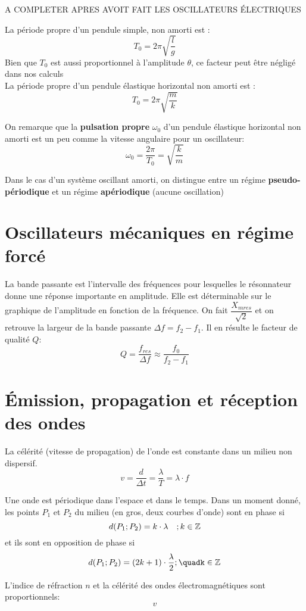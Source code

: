 \begin{Definition}
A COMPLETER APRES AVOIT FAIT LES OSCILLATEURS ÉLECTRIQUES

La période propre d'un pendule simple, non amorti est : 
$$T_{0}=2\pi\sqrt{\dfrac{l}{g}}$$
Bien que $T_{0}$ est aussi proportionnel à l'amplitude $\theta$, ce facteur peut être négligé dans nos calculs\\

La période propre d'un pendule élastique horizontal non amorti est :
$$T_{0}=2\pi\sqrt{\dfrac{m}{k}}$$

On remarque que la \textbf{pulsation propre} $\omega_{0}$ d'un pendule élastique horizontal non amorti est un peu comme la vitesse angulaire pour un oscillateur:
$$\omega_{0}=\dfrac{2\pi}{T_{0}}=\sqrt{\dfrac{k}{m}}$$

Dans le cas d'un système oscillant amorti, on distingue entre un régime \textbf{pseudo-périodique} et un régime \textbf{apériodique} (aucune oscillation)

\end{Definition}



\section{Oscillateurs mécaniques en régime forcé}

\begin{Definition}

La bande passante est l'intervalle des fréquences pour lesquelles le résonnateur donne une réponse importante en amplitude. Elle est déterminable sur le graphique de l'amplitude en fonction de la fréquence. On fait $\dfrac{X_{mres}}{\sqrt{2}}$ et on retrouve la largeur de la bande passante $\Delta f = f_{2} - f_{1}$. Il en résulte le facteur de qualité $Q$:
$$Q=\dfrac{f_{res}}{\Delta f} \approx \dfrac{f_{0}}{f_{2}-f_{1}} $$  

\end{Definition}



\section{Émission, propagation et réception des ondes}

\begin{Definition}

La célérité (vitesse de propagation) de l'onde est constante dans un milieu non dispersif.
$$v=\dfrac{d}{\Delta t} = \dfrac{\lambda}{T} = \lambda \cdot f$$

Une onde est périodique dans l'espace et dans le temps. Dans un moment donné, les points $P_{1}$ et $P_{2}$ du milieu (en gros, deux courbes d'onde) sont en phase si 
$$d(P_{1};P_{2})=k\cdot\lambda\quad;k\in\mathbb{Z}$$
et ils sont en opposition de phase si
$$d(P_{1};P_{2})=(2k+1)\cdot\dfrac{\lambda}{2};\quadk\in\Z$$

L'indice de réfraction $n$ et la célérité des ondes électromagnétiques sont proportionnels:
$$v$$
\end{Definition}



